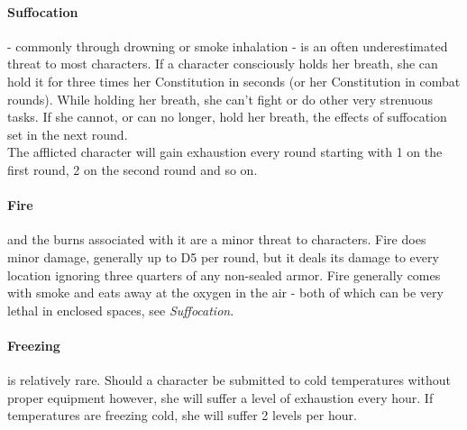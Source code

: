 \documentclass[12pt,a4paper,openany,usenames,dvipsnames]{book}
\begin{document}
	\paragraph{Suffocation}- commonly through drowning or smoke inhalation - is an often underestimated threat to most characters. If a character consciously holds her breath, she can hold it for three times her Constitution in seconds (or her Constitution in combat rounds).
	While holding her breath, she can’t fight or do other very strenuous tasks. If she cannot, or can no longer, hold her breath, the effects of suffocation set in the next round.\\
	The afflicted character will gain exhaustion every round starting with 1 on the first round, 2 on the second round and so on.
	\paragraph{Fire} and the burns associated with it are a minor threat to characters. Fire does minor damage, generally up to D5 per round, but it deals its damage to every location ignoring three quarters of any non-sealed armor. Fire generally comes with smoke and eats away at the oxygen in the air - both of which can be very lethal in enclosed spaces, see \emph{Suffocation}.
	\paragraph{Freezing} is relatively rare. Should a character be submitted to cold temperatures without proper equipment however, she will suffer a level of exhaustion every hour. If temperatures are freezing cold, she will suffer 2 levels per hour.
	
\end{document}
